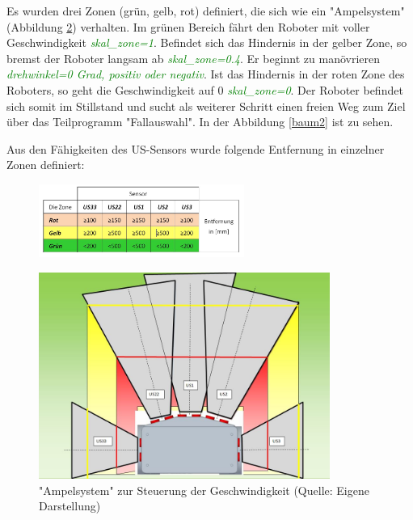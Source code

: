 Es wurden drei Zonen (grün, gelb, rot)  definiert, die sich wie ein "Ampelsystem"  (Abbildung \ref{zone}) verhalten. Im grünen Bereich fährt den Roboter mit voller Geschwindigkeit \textcolor{green}{\textit{skal\_zone=1}}. Befindet sich das Hindernis in der gelber Zone, so bremst der Roboter langsam ab \textcolor{green}{\textit{skal\_zone=0.4}}. Er beginnt zu manövrieren \textcolor{green}{\textit{drehwinkel=0 Grad, positiv oder negativ}}. Ist das Hindernis in der roten Zone des Roboters, so geht die Geschwindigkeit auf 0 \textcolor{green}{\textit{skal\_zone=0}}. Der Roboter befindet sich somit im Stillstand und sucht als weiterer Schritt einen freien Weg zum Ziel über das Teilprogramm "Fallauswahl". In der Abbildung \ref{baum2} ist zu sehen.

Aus den Fähigkeiten des US-Sensors wurde folgende Entfernung in einzelner Zonen definiert:
\begin{figure}[!h]  %
	\centering\includegraphics[width=0.60\textwidth]{images/entf.jpg}
	\label{entf} %
\end{figure}

\begin{figure}[!h]  %
	\centering\includegraphics[width=0.85\textwidth]{images/H-UMF.jpg}
	\caption{ "Ampelsystem" zur Steuerung der Geschwindigkeit \newline (Quelle: Eigene Darstellung)}
	\label{zone} %
\end{figure}

